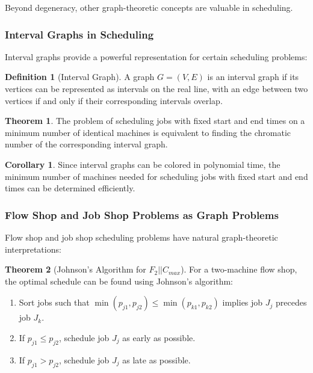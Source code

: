 \documentclass{article}
\theoremstyle{definition}
\newtheorem{theorem}{Theorem}
\newtheorem{corollary}{Corollary}
\newtheorem{definition}{Definition}
\begin{document}
Beyond degeneracy, other graph-theoretic concepts are valuable in scheduling.

\subsubsection*{Interval Graphs in Scheduling}

Interval graphs provide a powerful representation for certain scheduling problems:

\begin{definition}[Interval Graph]
A graph $G = (V, E)$ is an interval graph if its vertices can be represented as intervals on the real line, with an edge between two vertices if and only if their corresponding intervals overlap.
\end{definition}

\begin{theorem}
The problem of scheduling jobs with fixed start and end times on a minimum number of identical machines is equivalent to finding the chromatic number of the corresponding interval graph.
\end{theorem}

\begin{corollary}
Since interval graphs can be colored in polynomial time, the minimum number of machines needed for scheduling jobs with fixed start and end times can be determined efficiently.
\end{corollary}

\subsubsection*{Flow Shop and Job Shop Problems as Graph Problems}

Flow shop and job shop scheduling problems have natural graph-theoretic interpretations:

\begin{theorem}[Johnson's Algorithm for $F_2||C_{max}$]
For a two-machine flow shop, the optimal schedule can be found using Johnson's algorithm:
\begin{enumerate}
    \item Sort jobs such that $\min(p_{j1}, p_{j2}) \leq \min(p_{k1}, p_{k2})$ implies job $J_j$ precedes job $J_k$.
    \item If $p_{j1} \leq p_{j2}$, schedule job $J_j$ as early as possible.
    \item If $p_{j1} > p_{j2}$, schedule job $J_j$ as late as possible.
\end{enumerate}
\end{theorem}
\end{document}
